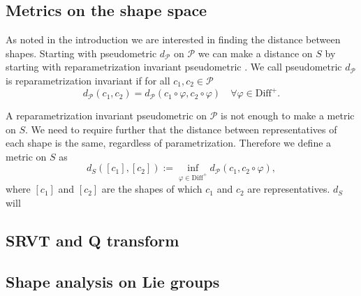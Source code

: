 \subsection{Metrics on the shape space}
As noted in the introduction we are interested in finding the distance between shapes. Starting with pseudometric  \(d_{\mathcal{P}}\) on  \(\mathcal{P}\) we can make a distance on \(S\) by starting with reparametrization invariant pseudometric . We call pseudometric  \(d_{\mathcal{P}}\) is reparametrization invariant if for all  \(c_1, c_2 \in \mathcal{P}\)
\begin{equation}
  d_{\mathcal{P}}(c_1, c_2)=d_{\mathcal{P}}(c_1 \circ \varphi, c_2\circ \varphi) \quad \forall \varphi \in \text{Diff}^+.
\end{equation}

A reparametrization invariant pseudometric on  \(\mathcal{P}\) is not enough to make a metric on  \(S\). We need to require further that the distance between representatives of each shape is the same, regardless of parametrization. Therefore we define a metric on  \(S\) as
\begin{equation}
  d_S ([c_1],[c_2]) := \inf_{\varphi \in \text{Diff}^+}{  d_{\mathcal{P}}(c_1,c_2 \circ \varphi)},
\end{equation}
where  \([c_1]\) and  \([c_2]\) are the shapes of which  \(c_1\) and  \(c_2\) are representatives.  \(d_S\) will
\subsection{SRVT and Q transform}

\subsection{Shape analysis on Lie groups}\label{subsec:shape-lie}
\cite{celledoni2016}